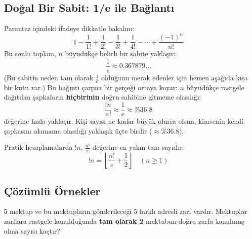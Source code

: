 \subsection{Doğal Bir Sabit: 1/e ile Bağlantı}

Parantez içindeki ifadeye dikkatle bakalım: \[ 1 - \frac{1}{1!} + \frac{1}{2!} -
\frac{1}{3!} + \frac{1}{4!} - \cdots + \frac{(-1)^n}{n!} \] Bu sonlu toplam, $n$
büyüdükçe belirli bir sabite yaklaşır: \[ \frac{1}{e} \approx 0.367879\dots \]
(Bu sabitin neden tam olarak $\frac{1}{e}$ olduğunu merak edenler için hemen
aşağıda kısa bir kutu var.) Bu bağıntı çarpıcı bir gerçeği ortaya koyar: $n$
büyüdükçe rastgele dağıtılan şapkaların \textbf{hiçbirinin} doğru sahibine gitmeme
olasılığı: \[ \frac{!n}{n!} \approx \frac{1}{e} \approx \%36.8 \] değerine hızla
yaklaşır. Kişi sayısı ne kadar büyük olursa olsun, kimsenin kendi şapkasını
alamama olasılığı yaklaşık üçte birdir ($\approx \%36.8$).


Pratik hesaplamalarda $!n$, $\frac{n!}{e}$ değerine en yakın tam sayıdır: \[ !n
= \left\lfloor \frac{n!}{e} + \frac{1}{2} \right\rfloor \quad (n \ge 1) \]

\subsection{Çözümlü Örnekler}

\begin{example} 5 mektup ve bu mektupların gönderileceği 5 farklı adresli zarf
vardır. Mektuplar zarflara rastgele konulduğunda \textbf{tam olarak 2} mektubun
doğru zarfa konulmuş olma sayısı kaçtır? \end{example}


